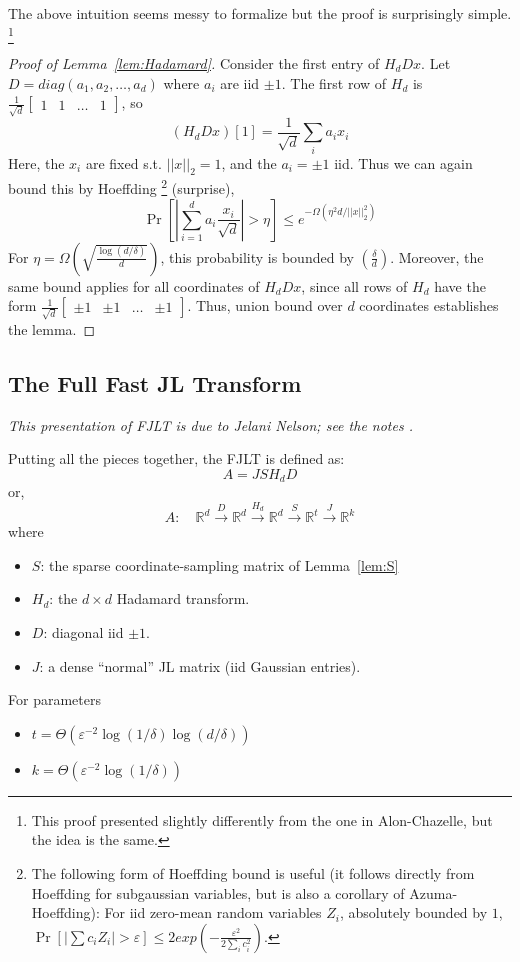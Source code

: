 \documentclass[]{article}
\newcommand{\1}{\mathbbm{1}}
\newcommand{\x}{\times}
\newcommand{\R}{\mathbb{R}}
\renewcommand{\epsilon}{\varepsilon}
\newcommand{\bmqty}[1]{\begin{bmatrix}#1\end{bmatrix}}
\begin{document}
The above intuition seems messy to formalize
but the proof is surprisingly simple.
\footnote{This proof presented slightly differently from the one in
Alon-Chazelle, but the idea is the same.}

\begin{proof}[Proof of Lemma~\ref{lem:Hadamard}]
Consider the first entry of $H_d D x$.
Let $D = diag(a_1, a_2, \dots, a_d)$ where $a_i$ are iid $\pm 1$.
The first row of $H_d$ is
$\frac{1}{\sqrt{d}} \bmqty{1 & 1 & \dots & 1}$, so
$$(H_d D x)[1] =
\frac{1}{\sqrt{d}}
\sum_i a_ix_i$$
Here, the $x_i$ are fixed s.t. $||x||_2=1$, and the $a_i = \pm 1$ iid.
Thus we can again bound this by Hoeffding
\footnote{
    The following form of Hoeffding bound is useful (it follows directly from
    Hoeffding for subgaussian variables, but is also a corollary of
    Azuma-Hoeffding):
    For iid zero-mean random variables $Z_i$, absolutely bounded by $1$,
    $\Pr[|\sum c_i Z_i| > \epsilon]
    \leq 2exp(-\frac{\epsilon^2}{2 \sum_i c_i^2})$.
}
    (surprise),
$$
\Pr[
|
\sum_{i=1}^d a_i \frac{x_i}{\sqrt{d}}|
> \eta]
\leq
e^{-\Omega(\eta^2 d / ||x||_2^2)}
$$
For $\eta = \Omega(\sqrt{\frac{\log(d/\delta)}{d}})$,
this probability is bounded by $(\frac{\delta}{d})$.
Moreover, the same bound applies for all coordinates of
$H_d Dx$, since all rows of $H_d$ have the form
$\frac{1}{\sqrt{d}} \bmqty{\pm 1 & \pm1 & \dots & \pm1}$.
Thus, union bound over $d$ coordinates establishes the lemma.
\end{proof}

\subsection{The Full Fast JL Transform}
{\it This presentation of FJLT is due to Jelani Nelson; see the notes \cite{jlnotes}.}

Putting all the pieces together,
the FJLT is defined as:
$$A = J S H_d D$$
or,
$$
A: \quad
\R^d
\overset{D}{\longrightarrow}
\R^d
\overset{H_d}{\longrightarrow}
\R^d
\overset{S}{\longrightarrow}
\R^t
\overset{J}{\longrightarrow}
\R^k
$$
where
\begin{itemize}
    \item $S$: the sparse coordinate-sampling matrix of Lemma~\ref{lem:S}
    \item $H_d$: the $d \x d$ Hadamard transform.
    \item $D$: diagonal iid $\pm 1$.
    \item $J$: a dense ``normal'' JL matrix (iid Gaussian entries).
\end{itemize}
For parameters
\begin{itemize}
    \item $t = \Theta(\epsilon^{-2}\log(1/\delta)\log(d / \delta))$
    \item $k = \Theta(\epsilon^{-2}\log(1/\delta))$
\end{itemize}
\end{document}
